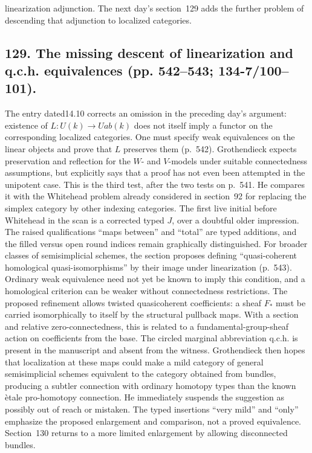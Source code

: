\documentclass[10pt,oneside]{book}
\begin{document}
linearization adjunction. The next day's section~129 adds the further problem of descending that adjunction to localized categories.

\subsection*{129. The missing descent of linearization and q.c.h. equivalences (pp. 542--543; 134-7/100--101).}
The entry dated14.10 corrects an omission in the preceding day's argument: existence of $L:U(k)\to Uab(k)$ does not itself imply a functor on the corresponding localized categories. One must specify weak equivalences on the linear objects and prove that $L$ preserves them (p.~542). Grothendieck expects preservation and reflection for the $W$- and $V$-models under suitable connectedness assumptions, but explicitly says that a proof has not even been attempted in the unipotent case. This is the third test, after the two tests on p.~541. He compares it with the Whitehead problem already considered in section~92 for replacing the simplex category by other indexing categories. The first live initial before Whitehead in the scan is a corrected typed $J$, over a doubtful older impression. The raised qualifications ``maps between'' and ``total'' are typed additions, and the filled versus open round indices remain graphically distinguished. For broader classes of semisimplicial schemes, the section proposes defining ``quasi-coherent homological quasi-isomorphisms'' by their image under linearization (p.~543). Ordinary weak equivalence need not yet be known to imply this condition, and a homological criterion can be weaker without connectedness restrictions. The proposed refinement allows twisted quasicoherent coefficients: a sheaf $F_*$ must be carried isomorphically to itself by the structural pullback maps. With a section and relative zero-connectedness, this is related to a fundamental-group-sheaf action on coefficients from the base. The circled marginal abbreviation q.c.h. is present in the manuscript and absent from the witness. Grothendieck then hopes that localization at these maps could make a mild category of general semisimplicial schemes equivalent to the category obtained from bundles, producing a subtler connection with ordinary homotopy types than the known \`etale pro-homotopy connection. He immediately suspends the suggestion as possibly out of reach or mistaken. The typed insertions ``very mild'' and ``only'' emphasize the proposed enlargement and comparison, not a proved equivalence. Section~130 returns to a more limited enlargement by allowing disconnected bundles.
\end{document}
